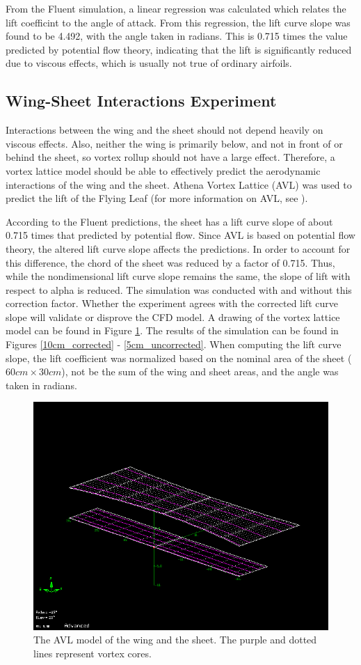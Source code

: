 \documentclass[12pt]{report} %
\begin{document}
From the Fluent simulation, a linear regression was calculated which relates the lift coefficint to the angle of attack. From
this regression, the lift curve slope was found to be 4.492, with the angle taken in radians. This is 0.715 times the value predicted
by potential flow theory, indicating that the lift is significantly reduced due to viscous effects, which is usually not true of
ordinary airfoils.

\subsection{Wing-Sheet Interactions Experiment}
Interactions between the wing and the sheet should not depend heavily on viscous effects. Also, neither the wing is primarily below,
and not in front of or behind the sheet, so vortex rollup should not have a large effect. Therefore, a vortex lattice model should
be able to effectively predict the aerodynamic interactions of the wing and the sheet. Athena Vortex Lattice (AVL) was used to predict
the lift of the Flying Leaf (for more information on AVL, see \cite{AVL}).

According to the Fluent predictions, the sheet has a lift curve slope of about 0.715 times that predicted by potential flow. Since AVL
is based on potential flow theory, the altered lift curve slope affects the predictions. In order to account for this difference, the
chord of the sheet was reduced by a factor of 0.715. Thus, while the nondimensional lift curve slope remains the same, the slope of
lift with respect to alpha is reduced. The simulation was conducted with and without this correction factor. Whether the experiment
agrees with the corrected lift curve slope will validate or disprove the CFD model. A drawing of the vortex lattice model can be
found in Figure \ref{avl_model}. The results of the simulation can be found in Figures \ref{10cm_corrected} - \ref{5cm_uncorrected}.
When computing the lift curve slope, the lift coefficient was normalized based on the nominal area of the sheet ($60cm \times 30cm$),
not be the sum of the wing and sheet areas, and the angle was taken in radians.

\begin{figure}
\includegraphics[width = 0.7\linewidth]{avl_model.png}
\caption{The AVL model of the wing and the sheet. The purple and dotted lines represent vortex cores.}
\label{avl_model}
\end{figure}
\end{document}
